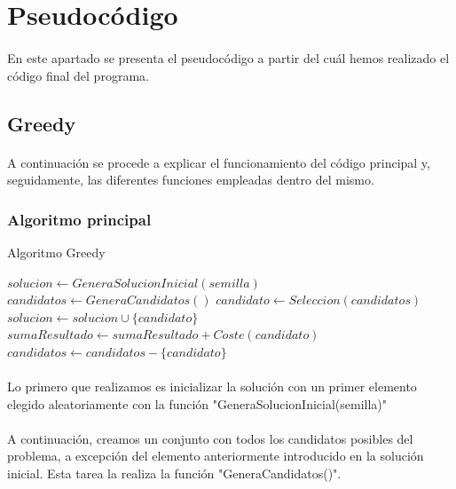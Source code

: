 \documentclass{article}
\begin{document}
	\section{Pseudocódigo}
	
	\paragraph{}En este apartado se presenta el pseudocódigo a partir del cuál hemos realizado el código final del programa.
	
	\subsection{Greedy}
	
	\paragraph{}A continuación se procede a explicar el funcionamiento del código principal y, seguidamente, las diferentes funciones empleadas dentro del mismo.
	
	\subsubsection{Algoritmo principal}
	\begin{algorithm}[H]
		\caption{Algoritmo Greedy}
		\begin{algorithmic}
			\STATE $solucion \leftarrow GeneraSolucionInicial(semilla)$
			\STATE $candidatos \leftarrow GeneraCandidatos()$
			\STATE $candidato \leftarrow Seleccion(candidatos)$
			\STATE $solucion \leftarrow solucion \cup \{candidato\}$
			\STATE $sumaResultado \leftarrow sumaResultado + Coste(candidato)$
			\ENDIF
			\STATE $candidatos \leftarrow candidatos - \{ candidato \}$
			\ENDWHILE
		\end{algorithmic}
	\end{algorithm}
	
	\paragraph{}Lo primero que realizamos es inicializar la solución con un primer elemento elegido aleatoriamente con la función "GeneraSolucionInicial(semilla)"
	
	\paragraph{}A continuación, creamos un conjunto con todos los candidatos posibles del problema, a excepción del elemento anteriormente introducido en la solución inicial. Esta tarea la realiza la función "GeneraCandidatos()".
	
\end{document}
